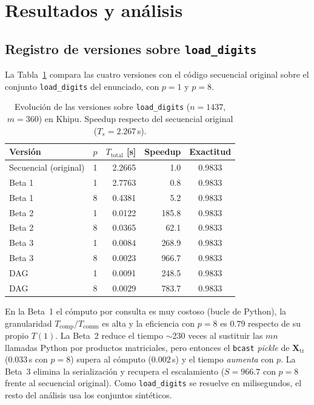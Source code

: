 \documentclass[11pt,a4paper]{article}
\newcommand{\ntr}{n}   %
\newcommand{\mte}{m}   %
\newcommand{\Xtr}{\mathbf{X}_{\text{tr}}}
\newcommand{\Tcomp}{T_{\text{comp}}}
\newcommand{\Tcomm}{T_{\text{comm}}}
\newcommand{\Ttot}{T_{\text{total}}}
\begin{document}
\section{Resultados y análisis}

\subsection{Registro de versiones sobre \texttt{load\_digits}}
La Tabla~\ref{tab:versiones} compara las cuatro versiones con el código secuencial original sobre
el conjunto \texttt{load\_digits} del enunciado, con $p=1$ y $p=8$.

\begin{table}[H]
\centering
\caption{Evolución de las versiones sobre \texttt{load\_digits} ($\ntr=1437$, $\mte=360$) en Khipu.
Speedup respecto del secuencial original ($T_s=2.267$\,s).}
\label{tab:versiones}
\begin{tabular}{lrrrc}
\toprule
Versión & $p$ & $\Ttot$ [s] & Speedup & Exactitud\\
\midrule
Secuencial (original) & 1 & 2.2665 & 1.0 & 0.9833\\
Beta 1 & 1 & 2.7763 & 0.8 & 0.9833\\
Beta 1 & 8 & 0.4381 & 5.2 & 0.9833\\
Beta 2 & 1 & 0.0122 & 185.8 & 0.9833\\
Beta 2 & 8 & 0.0365 & 62.1 & 0.9833\\
Beta 3 & 1 & 0.0084 & 268.9 & 0.9833\\
Beta 3 & 8 & 0.0023 & 966.7 & 0.9833\\
DAG    & 1 & 0.0091 & 248.5 & 0.9833\\
DAG    & 8 & 0.0029 & 783.7 & 0.9833\\
\bottomrule
\end{tabular}
\end{table}

En la Beta~1 el cómputo por consulta es muy costoso (bucle de Python), la granularidad
$\Tcomp/\Tcomm$ es alta y la eficiencia con $p=8$ es $0.79$ respecto de su propio $T(1)$. La Beta~2
reduce el tiempo $\sim$230 veces al sustituir las $\mte\ntr$ llamadas Python por productos
matriciales, pero entonces el \texttt{bcast} \emph{pickle} de $\Xtr$ ($0.033$\,s con $p=8$) supera
al cómputo ($0.002$\,s) y el tiempo \emph{aumenta} con $p$. La Beta~3 elimina la serialización y
recupera el escalamiento ($S=966.7$ con $p=8$ frente al secuencial original). Como
\texttt{load\_digits} se resuelve en milisegundos, el resto del análisis usa los conjuntos
sintéticos.
\end{document}
